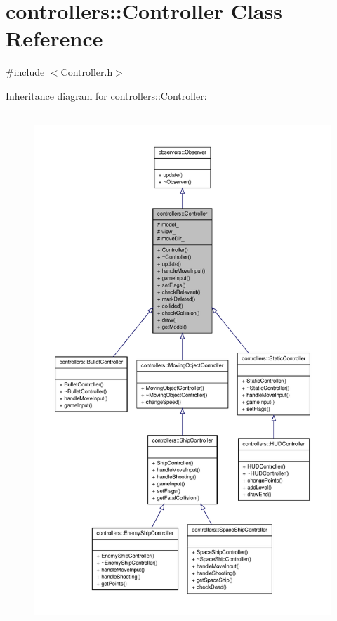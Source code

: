 \hypertarget{classcontrollers_1_1Controller}{\section{controllers\-:\-:\-Controller \-Class \-Reference}
\label{d4/d85/classcontrollers_1_1Controller}
}


{\ttfamily \#include $<$\-Controller.\-h$>$}



\-Inheritance diagram for controllers\-:\-:\-Controller\-:
\nopagebreak
\begin{figure}[H]
\begin{center}
\leavevmode
\includegraphics[height=550pt]{d0/dba/classcontrollers_1_1Controller__inherit__graph}
\end{center}
\end{figure}


